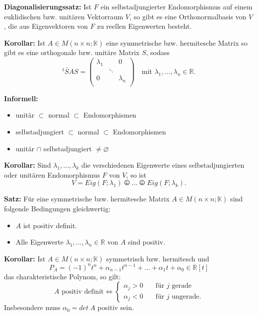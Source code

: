 \documentclass{article}
\begin{document}
\textbf{Diagonalisierungssatz:} Ist $F$ ein selbstadjungierter Endomorphismus
auf einem euklidischen bzw. unitären Vektorraum $V$, so gibt es eine
Orthonormalbasis von $V$, die aus Eigenvektoren von $F$ zu reellen Eigenwerten
besteht.

\textbf{Korollar:} Ist $A\in M(n\times n;\mathbb{K})$ eine symmetrische bzw.
hermitesche Matrix so gibt es eine orthogonale bzw. unitäre Matrix $S$, sodass
\begin{equation*}
	^t\bar SAS=
\begin{pmatrix}
	\lambda_1&&0\\
	&\ddots&\\
	0&&\lambda_n\\
\end{pmatrix}
	\quad\text{mit } \lambda_1,\dots,\lambda_n\in\mathbb{R}.
\end{equation*}

\textbf{Informell:} 
\begin{itemize}
\item[] unitär $\subset$ normal $\subset$ Endomorphismen
\item[] selbstadjungiert $\subset$ normal $\subset$ Endomorphismen
\item[] unitär $\cap$ selbstadjungiert $\neq \varnothing$
\end{itemize}

\textbf{Korollar:} Sind $\lambda_1,\dots,\lambda_k$ die verschiedenen Eigenwerte
eines selbstadjungierten oder unitären Endomorphismus $F$ von $V$, so ist
\begin{equation*}
	V=Eig(F;\lambda_1)\operp\dots\operp Eig(F;\lambda_k).
\end{equation*}

\textbf{Satz:} Für eine symmetrische bzw. hermitesche Matrix $A\in M(n\times
n;\mathbb{K})$ sind folgende Bedingungen gleichwertig:
\begin{itemize}
\item[i)] $A$ ist positiv definit.
\item[ii)] Alle Eigenwerte $\lambda_1,\dots,\lambda_n\in\mathbb{R}$ von $A$
	sind positiv.
\end{itemize}

\textbf{Korollar:} Ist $A\in M(n\times n;\mathbb{K})$ symmetrisch bzw.
hermitesch und
\begin{equation*}
P_A=(-1)^nt^n+\alpha_{n-1}t^{n-1}+\dots+\alpha_1t+\alpha_0\in\mathbb{R}[t]
\end{equation*}
das charakteristische Polynom, so gilt:
\begin{equation*}
	A\text{ positiv definit}  \iff \left\{ 
\begin{aligned}
    \alpha_j>0& \quad \text{für $j$ gerade} \\
    \alpha_j<0& \quad \text{für $j$ ungerade.}
\end{aligned}
\right.
\end{equation*}
Insbesondere muss $\alpha_0=det\ A$ positiv sein.
\end{document}
